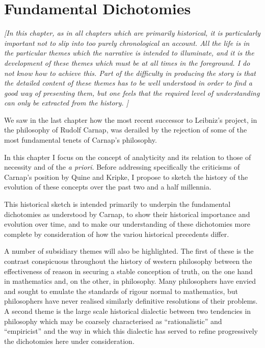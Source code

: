 \chapter{Fundamental Dichotomies}\label{FundamentalDichotomies}

\emph{[In this chapter, as in all chapters which are primarily
    historical, it is particularly important not to slip into too
    purely chronological an account. 
All the life is in the particular themes which the narrative is
intended to illuminate, and it is the development of these
themes which must be at all times in the foreground. 
I do not know how to achieve this.
Part of the difficulty in producing the story is that the detailed
content of these themes has to be well understood in order to find a
good way of presenting them, but one feels that the required level of
understanding can only be extracted from the history. 
]}

We saw in the last chapter how the most recent successor to
Leibniz's project, in the philosophy of Rudolf
Carnap, was derailed by the rejection of some of
the most fundamental tenets of Carnap's philosophy. 

In this chapter I focus on the concept of analyticity and
its relation to those of necessity and of the \emph{a priori}.
Before addressing specifically the criticisms of Carnap's position by
Quine and Kripke, I propose to sketch the history of the evolution of
these concepts over the past two and a half millennia.

This historical sketch is intended primarily to underpin the
fundamental dichotomies as understood by Carnap, to show their
historical importance and evolution over time, and to make our
understanding of these dichotomies more complete by consideration of
how the variou historical precedents differ.

A number of subsidiary themes will also be highlighted.
The first of these is the contrast conspicuous throughout the history of
western philosophy between the effectiveness of reason in securing a
stable conception of truth, on the one hand in mathematics and, on the
other, in philosophy.
Many philosophers have envied and sought to emulate the standards of
rigour normal to mathematics, but philosophers have never realised
similarly definitive resolutions of their problems.
A second theme is the large scale historical dialectic between two
tendencies in philosophy which may be coarsely characterised as
``rationalistic'' and ``empiricist'' and the way in which this
dialectic has served to refine progressively the dichotomies here
under consideration.


